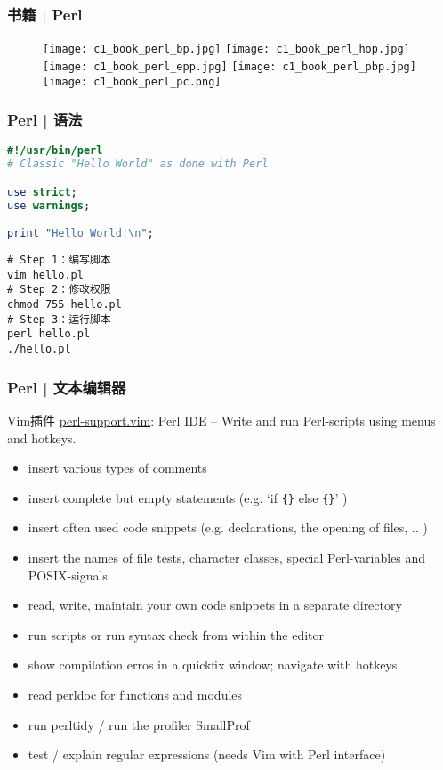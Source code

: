 \begin{frame}
  \frametitle{书籍 | Perl}
  \begin{figure}
    \centering
    \texttt{[image: c1\_book\_perl\_bp.jpg]}\qquad
    \texttt{[image: c1\_book\_perl\_hop.jpg]}\\
    \texttt{[image: c1\_book\_perl\_epp.jpg]}\quad
    \texttt{[image: c1\_book\_perl\_pbp.jpg]}\quad
    \texttt{[image: c1\_book\_perl\_pc.png]}
  \end{figure}
\end{frame}

\begin{frame}[fragile]
  \frametitle{Perl | \alert{语法}}
  \vspace{-1.5em}
\begin{lstlisting}[language=Perl]
#!/usr/bin/perl
# Classic "Hello World" as done with Perl

use strict;
use warnings;

print "Hello World!\n";
\end{lstlisting}
\pause
\begin{lstlisting}
# Step 1：编写脚本
vim hello.pl
# Step 2：修改权限
chmod 755 hello.pl
# Step 3：运行脚本
perl hello.pl
./hello.pl
\end{lstlisting}
\end{frame}

\begin{frame}[fragile]
  \frametitle{Perl | 文本编辑器}
  \begin{block}{Vim插件}
    \href{https://github.com/vim-scripts/perl-support.vim}{perl-support.vim}: Perl IDE -- Write and run Perl-scripts using menus and hotkeys.
  \end{block}
  {\footnotesize
  \begin{itemize}
    \item insert various types of comments
    \item insert complete but empty statements (e.g. `if \verb|{}| else \verb|{}|' )
    \item insert often used code snippets (e.g. declarations, the opening of files, .. )
    \item insert the names of file tests, character classes, special Perl-variables and POSIX-signals
    \item read, write, maintain your own code snippets in a separate directory
    \item run scripts or run syntax check from within the editor
    \item show compilation erros in a quickfix window; navigate with hotkeys 
    \item read perldoc for functions and modules 
    \item run perltidy / run the profiler SmallProf
    \item test / explain regular expressions (needs Vim with Perl interface)
  \end{itemize}
}
\end{frame}

